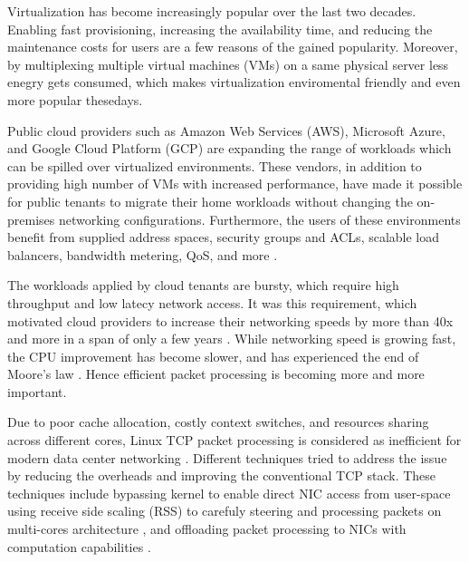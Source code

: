 
Virtualization has become increasingly popular over the last two decades. Enabling fast 
provisioning, increasing the availability time, and reducing the maintenance costs
for users are a few reasons of the gained popularity. Moreover, by multiplexing 
multiple virtual machines (VMs) on a same physical server less enegry gets consumed, 
which makes virtualization enviromental friendly and even more popular thesedays.

Public cloud providers such as Amazon Web Services (AWS), Microsoft Azure, and Google Cloud
Platform (GCP) are expanding the range of workloads which can be spilled over virtualized environments. 
These  vendors, in addition to providing high number of VMs with increased performance, have made 
it possible for public tenants to migrate their home workloads without changing the 
on-premises networking configurations. Furthermore, the users of these environments
benefit from supplied address spaces, security groups and ACLs, scalable load balancers, 
bandwidth metering, QoS, and more \cite{firestone2017vfp}.


The workloads applied by cloud tenants are bursty, which require high throughput and low latecy 
network access. It was this requirement, which motivated cloud providers to increase their networking 
speeds by more than 40x and more in a span of only a few years \cite{firestone2018azure}. While 
networking speed is growing fast, the CPU improvement has become slower, and has experienced the 
end of Moore's law \cite{esmaeilzadeh2011dark}. Hence efficient packet processing is becoming 
more and more important. 

Due to poor cache allocation, costly context switches, and resources sharing across different 
cores, Linux TCP packet processing is considered as inefficient for modern data center 
networking \cite{kaufmann2019tas, shashidhara2022flextoe}. Different techniques tried 
to address the issue by reducing the overheads and improving the conventional TCP stack.
These techniques include bypassing kernel to enable direct NIC access from user-space
\cite{belay2014ix, jeong2014mtcp, prekas2017zygos}
using receive side scaling (RSS) to carefuly steering and processing packets on multi-cores 
architecture \cite{marty2019snap, kaufmann2019tas}, and offloading packet processing to 
NICs with computation capabilities 
\cite{arashloo2020enabling, lin2020panic, firestone2018azure, shashidhara2022flextoe}. 


